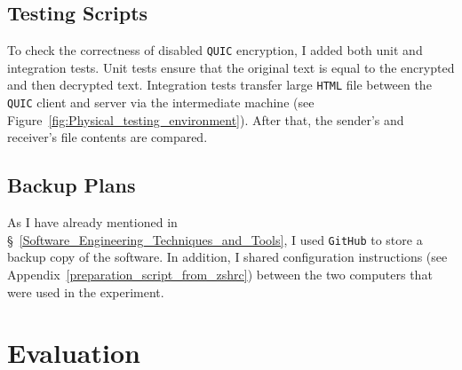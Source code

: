 \documentclass[12pt,a4paper,twoside,openright]{report}
\begin{document}
\section{Testing Scripts}

To check the correctness of disabled \texttt{QUIC} encryption, I added both unit and integration tests.
Unit tests ensure that the original text is equal to the encrypted and then decrypted text.
Integration tests transfer large \texttt{HTML} file between the \texttt{QUIC} client and server via the intermediate machine (see Figure~\ref{fig:Physical_testing_environment}).
After that, the sender's and receiver's file contents are compared.


\section{Backup Plans}
As I have already mentioned in \S~\ref{Software_Engineering_Techniques_and_Tools}, I used \texttt{GitHub} to store a backup copy of the software.
In addition, I shared configuration instructions (see Appendix~\ref{preparation_script_from_zshrc}) between the two computers that were used in the experiment.



\chapter{Evaluation}


\end{document}
